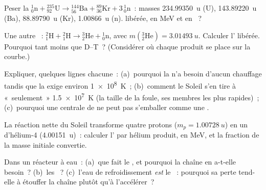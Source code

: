 \begin{exercise}[$\star\star$]\label{exo:g12:nuclear-energy:7}
Peser la 
${}^{1}_{0}\mathrm{n} + {}^{235}_{92}\mathrm{U} \to
{}^{144}_{56}\mathrm{Ba} + {}^{89}_{36}\mathrm{Kr} + 3\,{}^{1}_{0}\mathrm{n}$~:
masses \qty{234.99350}{u} (U), \qty{143.89220}{u} (Ba), \qty{88.89790}{u}
(Kr), \qty{1.00866}{u} (n).  libérée, en
\unit{MeV} et en ~?
\end{exercise}

\begin{exercise}[$\star\star$]\label{exo:g12:nuclear-energy:8}
Une autre ~:
${}^{2}_{1}\mathrm{H} + {}^{2}_{1}\mathrm{H} \to
{}^{3}_{2}\mathrm{He} + {}^{1}_{0}\mathrm{n}$, avec
$m({}^{3}_{2}\mathrm{He}) = \qty{3.01493}{u}$. Calculer
l' libérée. Pourquoi tant moins que D--T~?
(Considérer où chaque produit se place sur la courbe.)
\end{exercise}

\begin{exercise}[$\star\star$]\label{exo:g12:nuclear-energy:9}
Expliquer, quelques lignes chacune~: (a)~pourquoi la
 n'a besoin d'aucun chauffage tandis que la
 exige environ \qty{1e8}{K}~; (b)~comment le Soleil
s'en tire à «~seulement~» \qty{1.5e7}{K} (la taille de la foule, ses
membres les plus rapides)~; (c)~pourquoi une centrale de
 ne peut pas s'emballer comme une
.
\end{exercise}

\begin{exercise}[$\star\star$]\label{exo:g12:nuclear-energy:10}
La réaction nette du Soleil transforme quatre protons
($m_p = \qty{1.00728}{u}$) en un 
d'hélium-4 (\qty{4.00151}{u})~: calculer l'
par hélium produit, en \unit{MeV}, et la fraction de la masse initiale
convertie.
\end{exercise}

\begin{exercise}[$\star\star$]\label{exo:g12:nuclear-energy:11}
Dans un réacteur à eau~: (a)~que fait le
, et pourquoi la chaîne en a-t-elle
besoin~? (b)~les ~? (c)~l'eau de
refroidissement \emph{est} le ~: pourquoi
sa perte tend-elle à étouffer la chaîne plutôt qu'à l'accélérer~?
\end{exercise}

